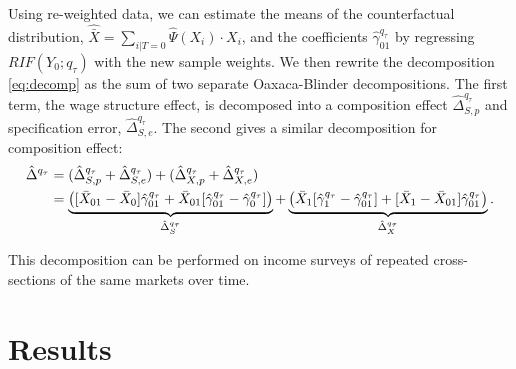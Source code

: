 Using re-weighted data, we can estimate the means of the counterfactual distribution, $\hat{\bar{X}}=\sum_{i|T=0}\hat{\Psi}(X_i) \cdot X_i$, and the coefficients $\hat{\gamma}_{01}^{q_\tau}$ by regressing $RIF(Y_0;q_\tau)$ with the new sample weights. We then rewrite the decomposition \eqref{eq:decomp} as the sum of two separate Oaxaca-Blinder decompositions. The first term, the wage structure effect, is decomposed into a composition effect $\hat{\Delta}^{q_\tau}_{S,p}$ and specification error, $\hat{\Delta}^{q_\tau}_{S,e}$. The second gives a similar decomposition for composition effect:
\begin{align}
  \hat{\Delta}^{q_\tau} &= (\hat{\Delta}^{q_\tau}_{S,p} + \hat{\Delta}^{q_\tau}_{S,e}) + (\hat{\Delta}^{q_\tau}_{X,p} + \hat{\Delta}^{q_\tau}_{X,e}) \notag \\
  &= \underbrace{\left( [\bar{X}_{01} - \bar{X}_0 ] \hat{\gamma}^{q_\tau}_{01} +
    \bar{X}_{01}[\hat{\gamma}_{01}^{q_\tau} - \hat{\gamma}_0^{q_\tau}] \right)}_{\hat{\Delta}^{q_\tau}_{S}} +
  \underbrace{\left( \bar{X}_{1}[\hat{\gamma}_{1}^{q_\tau} - \hat{\gamma}_{01}^{q_\tau}] + 
    [\bar{X}_{1} - \bar{X}_{01} ] \hat{\gamma}^{q_\tau}_{01}\right)}_{\hat{\Delta}^{q_\tau}_{X}}.
\end{align}

This decomposition can be performed on income surveys of repeated cross-sections of the same markets over time.

\section{Results}

